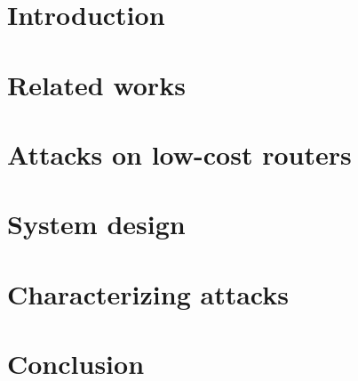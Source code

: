 \documentclass{sig-alternate-br}
\begin{document}


\section{Introduction}

\section{Related works}

\section{Attacks on low-cost routers}

\section{System design}

\section{Characterizing attacks}

\section{Conclusion}



\balance

\end{document}
